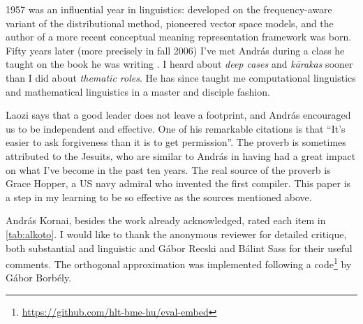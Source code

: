 \documentclass[11pt]{article}
\begin{document}
1957 was an influential year in linguistics: \cite{Harris:1957} developed on the
frequency-aware variant of the distributional method, \cite{Osgood:1957}
pioneered vector space models, and the author of a more recent conceptual
meaning representation framework \citep{Kornai:2010,Kornai:2018} was born.
Fifty years later (more precisely in fall 2006) I've met András during a class
he taught on the book he was writing \citep{Kornai:2007}. I heard about
\emph{deep cases} and \emph{k\={a}rakas} sooner than I did about \emph{thematic
roles}. He has since taught me computational linguistics and mathematical
linguistics in a master and disciple fashion.

Laozi says that a good leader does not leave a footprint, and András encouraged
us to be independent and effective. One of his remarkable citations is that
``It's easier to ask forgiveness than it is to get permission''. The proverb is
sometimes attributed to the Jesuits, who are similar to András in having had a
great impact on what I've become in the past ten years. The real source of the
proverb is Grace Hopper, a US navy admiral who invented the first compiler.
This paper is a step in my learning to be so effective as the sources
mentioned above.

\bigskip

András Kornai, besides the work already acknowledged, rated each item in
\cref{tab:alkoto}. I would like to thank the anonymous reviewer for detailed
critique, both substantial and linguistic and Gábor Recski and Bálint Sass for
their useful comments. The orthogonal approximation was implemented following a
code\footnote{\url{https://github.com/hlt-bme-hu/eval-embed}} by Gábor Borbély.

 
 
\end{document}
